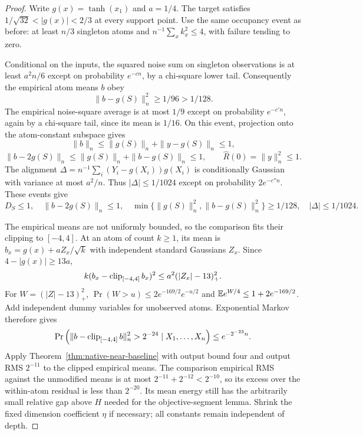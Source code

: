 \begin{proof}
Write $g(x)=\tanh(x_1)$ and $a=1/4$. The target satisfies
$1/\sqrt{32}<|g(x)|<2/3$ at every support point. Use the same occupancy event as before: at least $n/3$ singleton atoms and $n^{-1}\sum_x k_x^2\le4$, with failure tending to zero.

Conditional on the inputs, the squared noise sum on singleton observations is at least $a^2n/6$ except on probability $e^{-c n}$, by a chi-square lower tail. Consequently the empirical atom means $b$ obey
\[
 \|b-g(S)\|_n^2\ge1/96>1/128.
\]
The empirical noise-square average is at most $1/9$ except on probability $e^{-c'n}$, again by a chi-square tail, since its mean is $1/16$. On this event, projection onto the atom-constant subspace gives
\[
 \|b\|_n\le\|g(S)\|_n+\|y-g(S)\|_n\le1,
\]
\[
 \|b-2g(S)\|_n\le\|g(S)\|_n+\|b-g(S)\|_n\le1,
 \qquad \widehat R(0)=\|y\|_n^2\le1.
\]
The alignment
$\Delta=n^{-1}\sum_i (Y_i-g(X_i))g(X_i)$ is conditionally Gaussian with variance at most $a^2/n$. Thus $|\Delta|\le1/1024$ except on probability $2e^{-c''n}$. These events give
\begin{equation}
 D_S\le1,\quad\|b-2g(S)\|_n\le1,\quad
 \min\{\|g(S)\|_n^2,\|b-g(S)\|_n^2\}\ge1/128,
 \quad |\Delta|\le1/1024.
 \label{eq:gaussian-accuracy-sample}
\end{equation}

The empirical means are not uniformly bounded, so the comparison fits their clipping to $[-4,4]$. At an atom of count $k\ge1$, its mean is $b_x=g(x)+aZ_x/\sqrt k$ with independent standard Gaussians $Z_x$. Since $4-|g(x)|\ge13a$,
\[
 k(b_x-\operatorname{clip}_{[-4,4]}b_x)^2\le a^2(|Z_x|-13)_+^2.
\]
For $W=(|Z|-13)_+^2$,
$\Pr(W>u)\le2e^{-169/2}e^{-u/2}$ and
$\mathbb E e^{W/4}\le1+2e^{-169/2}$. Add independent dummy variables for unobserved atoms. Exponential Markov therefore gives
\[
 \Pr\left(\|b-\operatorname{clip}_{[-4,4]}b\|_n^2>2^{-24}
                   \mid X_1,\ldots,X_n\right)
 \le e^{-2^{-23}n}.
\]
Apply Theorem~\ref{thm:native-near-baseline} with output bound four and output RMS $2^{-11}$ to the clipped empirical means. The comparison empirical RMS against the unmodified means is at most
$2^{-11}+2^{-12}<2^{-10}$, so its excess over the within-atom residual is less than $2^{-20}$. Its mean energy still has the arbitrarily small relative gap above $H$ needed for the objective-segment lemma. Shrink the fixed dimension coefficient $\eta$ if necessary; all constants remain independent of depth.


\end{proof}
